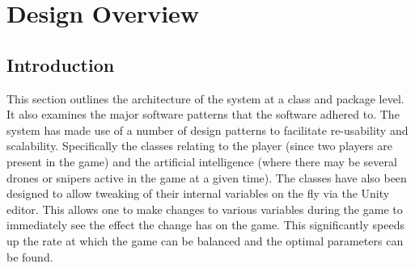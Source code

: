 \documentclass[11pt,a4paper]{article}
\begin{document}
\section{Design Overview}
\label{s:design-overview}
\subsection{Introduction}
This section outlines the architecture of the system at a class and package level. It also examines the major software patterns that the software adhered to. The system has made use of a number of design patterns to facilitate re-usability and scalability. Specifically the classes relating to the player (since two players are present in the game) and the artificial intelligence (where there may be several drones or snipers active in the game at a given time). The classes have also been designed to allow tweaking of their internal variables on the fly via the Unity editor. This allows one to make changes to various variables during the game to immediately see the effect the change has on the game. This significantly speeds up the rate at which the game can be balanced and the optimal parameters can be found.
\end{document}
